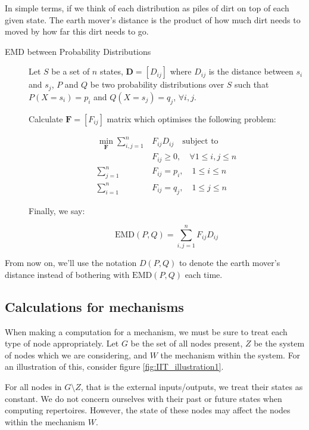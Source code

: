 In simple terms, if we think of each distribution as piles of dirt on top of each given state. The earth mover's distance is the product of how much dirt needs to moved by how far this dirt needs to go. 

\begin{description}
	\item[EMD between Probability Distributions] Let $S$ be a set of $n$ states, $\mathbf{D} = \left[ D_{ij}\right]$ where $D_{ij}$ is the distance between $s_i$ and $s_j$, $P$ and $Q$ be two probability distributions over $S$ such that $P(X = s_i) = p_i$ and $Q(X=s_j) = q_j$, $\forall i,j$. 
	
	Calculate $\mathbf{F} = \left[F_{ij}\right]$ matrix which optimises the following problem:
	
	\begin{align}
	\label{eq:EMD1}
	\min \limits_{\mathbf{F}}\sum \limits_{i,j=1}^n &F_{ij} D_{ij}\quad \text{subject to}\\
	&F_{ij}\geq 0,\quad \forall 1 \leq i,j \leq n\\
	\sum \limits_{j=1}^n &F_{ij} = p_i,\quad 1 \leq i \leq n\\
	\sum \limits_{i=1}^n &F_{ij} = q_j,\quad 1 \leq j \leq n
	\end{align}
	
	Finally, we say: 
	
	\begin{equation}
	\label{def:EMD}
	\text{EMD}(P, Q) = \sum \limits_{i,j=1}^{n} F_{ij} D_{ij}
	\end{equation}
\end{description}

From now on, we'll use the notation $D(P,Q)$ to denote the earth mover's distance instead of bothering with $\text{EMD}(P,Q)$ each time.

\subsection{Calculations for mechanisms}\label{sec:little_phi}
When making a computation for a mechanism, we must be sure to treat each type of node appropriately. Let $G$ be the set of all nodes present, $Z$ be the system of nodes which we are considering, and $W$ the mechanism within the system. For an illustration of this, consider figure \ref{fig:IIT_illustration1}.

For all nodes in $G\setminus Z$, that is the external inputs/outputs, we treat their states as constant. We do not concern ourselves with their past or future states when computing repertoires. However, the state of these nodes may affect the nodes within the mechanism $W$.

